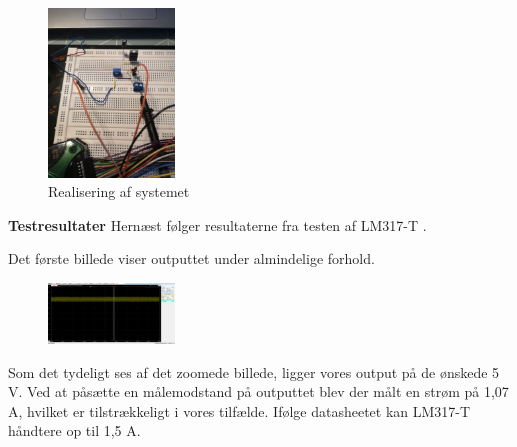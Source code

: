 \begin{figure}[h]
  \centering
  \includegraphics[width=0.3\textwidth]{bil2.jpg}
  \caption{Realisering af systemet}
  \label{fig:bil2}
\end{figure}


\textbf{Testresultater}\newline
Hernæst følger resultaterne fra testen af LM317-T .

Det første billede viser outputtet under almindelige forhold.
\begin{figure}[h]
  \centering
  \includegraphics[width=0.3\textwidth]{bil4.png}
  \caption{}
  \label{fig:bil4}
\end{figure}


\clearpage
Som det tydeligt ses af det zoomede billede, ligger vores output på de ønskede 5 V. Ved at påsætte en målemodstand på outputtet blev der målt en strøm på 1,07 A, hvilket er tilstrækkeligt i vores tilfælde. Ifølge datasheetet kan LM317-T håndtere op til 1,5 A.

